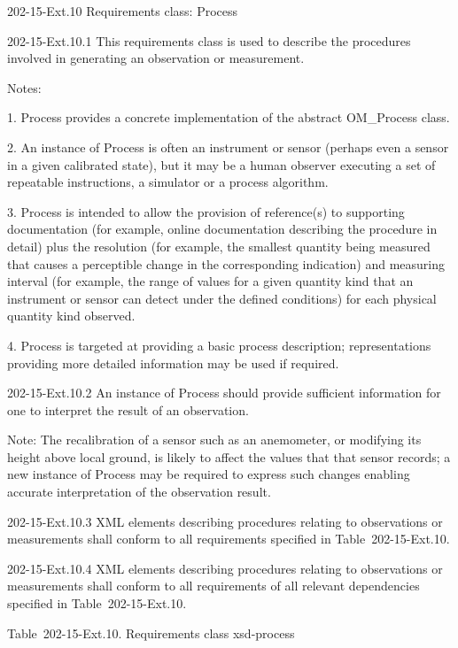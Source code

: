 202-15-Ext.10 Requirements class: Process

202-15-Ext.10.1 This requirements class is used to describe the procedures involved in generating an observation or measurement.

Notes:

1. Process provides a concrete implementation of the abstract OM\_Process class.

2. An instance of Process is often an instrument or sensor (perhaps even a sensor in a given calibrated state), but it may be a human observer executing a set of repeatable instructions, a simulator or a process algorithm.

3. Process is intended to allow the provision of reference(s) to supporting documentation (for example, online documentation describing the procedure in detail) plus the resolution (for example, the smallest quantity being measured that causes a perceptible change in the corresponding indication) and measuring interval (for example, the range of values for a given quantity kind that an instrument or sensor can detect under the defined conditions) for each physical quantity kind observed.

4. Process is targeted at providing a basic process description; representations providing more detailed information may be used if required.

202-15-Ext.10.2 An instance of Process should provide sufficient information for one to interpret the result of an observation.

Note: The recalibration of a sensor such as an anemometer, or modifying its height above local ground, is likely to affect the values that that sensor records; a new instance of Process may be required to express such changes enabling accurate interpretation of the observation result.

202-15-Ext.10.3 XML elements describing procedures relating to observations or measurements shall conform to all requirements specified in Table~202-15-Ext.10.

202-15-Ext.10.4 XML elements describing procedures relating to observations or measurements shall conform to all requirements of all relevant dependencies specified in Table~202-15-Ext.10.

Table~202-15-Ext.10. Requirements class xsd-process

